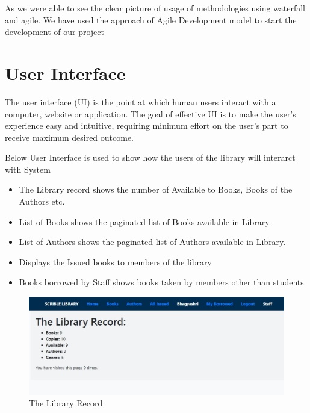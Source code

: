\documentclass[12pt, a4paper]{report}
\begin{document}
As we were able to see the clear picture of usage of methodologies using waterfall and agile. We have used the approach of Agile Development model to start the development of our project


\newpage
\section{User Interface}

The user interface (UI) is the point at which human users interact with a computer, website or application. The goal of effective UI is to make the user's experience easy and intuitive, requiring minimum effort on the user's part to receive maximum desired outcome.

Below User Interface is used to show how the users of the library will interarct with System
\begin{itemize}
	\item The Library record shows the number of Available to Books, Books of the Authors etc.
	\item List of Books shows the paginated list of Books available in Library.
	\item List of Authors shows the paginated list of Authors available in Library.
	\item Displays the Issued books to members of the library
	\item Books borrowed by Staff shows books taken by members other than students
\end{itemize}
\newpage
\begin{figure}[htb]
	\centering
	\includegraphics[scale=0.6]{./home} 
	\caption{The Library Record}
	\label{fig:librec} 
\end{figure}
\end{document}
